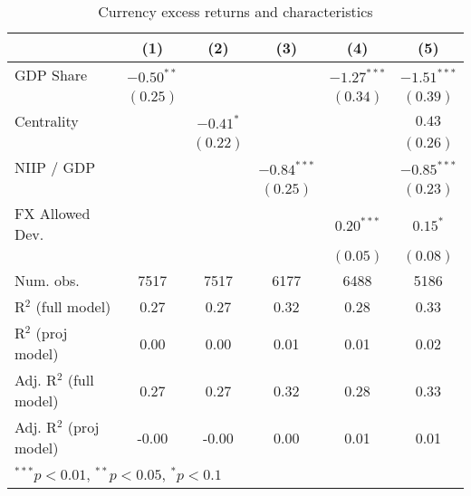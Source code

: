 
\begin{table}
\begin{center}
\begin{tabular}{l c c c c c }
\hline
 & (1) & (2) & (3) & (4) & (5) \\
\hline
GDP Share               & $-0.50^{**}$ &             &               & $-1.27^{***}$ & $-1.51^{***}$ \\
                        & $(0.25)$     &             &               & $(0.34)$      & $(0.39)$      \\
Centrality              &              & $-0.41^{*}$ &               &               & $0.43$        \\
                        &              & $(0.22)$    &               &               & $(0.26)$      \\
NIIP / GDP              &              &             & $-0.84^{***}$ &               & $-0.85^{***}$ \\
                        &              &             & $(0.25)$      &               & $(0.23)$      \\
FX Allowed Dev.         &              &             &               & $0.20^{***}$  & $0.15^{*}$    \\
                        &              &             &               & $(0.05)$      & $(0.08)$      \\
\hline
Num. obs.               & 7517         & 7517        & 6177          & 6488          & 5186          \\
R$^2$ (full model)      & 0.27         & 0.27        & 0.32          & 0.28          & 0.33          \\
R$^2$ (proj model)      & 0.00         & 0.00        & 0.01          & 0.01          & 0.02          \\
Adj. R$^2$ (full model) & 0.27         & 0.27        & 0.32          & 0.28          & 0.33          \\
Adj. R$^2$ (proj model) & -0.00        & -0.00       & 0.00          & 0.01          & 0.01          \\
\hline
\multicolumn{6}{l}{\scriptsize{$^{***}p<0.01$, $^{**}p<0.05$, $^*p<0.1$}}
\end{tabular}
\caption{Currency excess returns and characteristics}
\label{table:rx_char}
\end{center}
\end{table}
